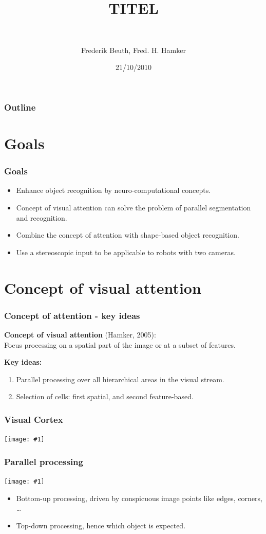\documentclass[12]{beamer}
\title{TITEL}
\subtitle{~} %
\author{Frederik Beuth, Fred. H. Hamker}
\date{21/10/2010} %
\newcommand{\showGrafic}[2]{
	\begin{center}
		\texttt{[image: \#1]}
	\end{center}
}
\begin{document}
\begin{frame}[plain]
  \titlepage
\end{frame}
%
\begin{frame}
  \frametitle{Outline}
  \tableofcontents
\end{frame}


\section{Goals}
\begin{frame}
  	\frametitle{Goals}
	\begin{itemize}
	  \item Enhance object recognition by neuro-computational concepts.
	  \item Concept of visual attention can solve the problem of parallel segmentation and recognition.	  
	  \item Combine the concept of attention with shape-based object recognition.
	  \item Use a stereoscopic input to be applicable to robots with two cameras.
	\end{itemize}	
\end{frame}


\section{Concept of visual attention}
%
\begin{frame}
  	\frametitle{Concept of attention - key ideas}
	\textbf{Concept of visual attention} (Hamker, 2005): \\
	Focus processing on a spatial part of the image or at a subset of features.

	\textbf{Key ideas:}
	\begin{enumerate}
	  \item Parallel processing over all hierarchical areas in the visual stream.
	  \item Selection of cells: first spatial, and second feature-based.
	\end{enumerate}	
\end{frame}

\begin{frame}
    \frametitle{Visual Cortex}
    \showGrafic{visualCortex5}{0.8}
\end{frame}

\begin{frame}
  	\frametitle{Parallel processing}	
	\showGrafic{parallelProcessing3}{0.9}
	\begin{itemize}
	  \item Bottom-up processing, driven by conspicuous image points like edges, corners, \ldots
	  \item Top-down processing, hence which object is expected.
	\end{itemize}
\end{frame}
\end{document}
